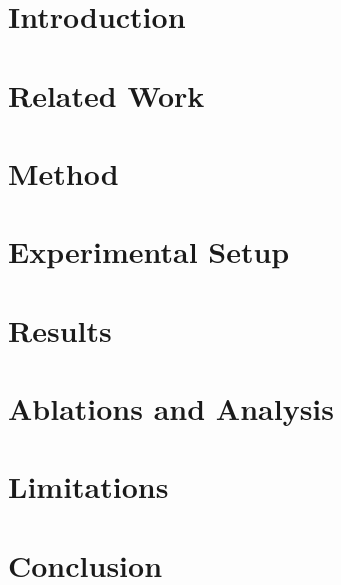 \documentclass[conference]{IEEEtran}
\begin{document}
\title{}

\author{}

\maketitle

\begin{abstract}

\end{abstract}

\begin{IEEEkeywords}

\end{IEEEkeywords}

\section{Introduction}\label{sec:intro}


\section{Related Work}\label{sec:related}


\section{Method}\label{sec:method}


\section{Experimental Setup}\label{sec:setup}


\section{Results}\label{sec:results}


\section{Ablations and Analysis}\label{sec:ablations}


\section{Limitations}\label{sec:limitations}


\section{Conclusion}\label{sec:conclusion}




\end{document}
